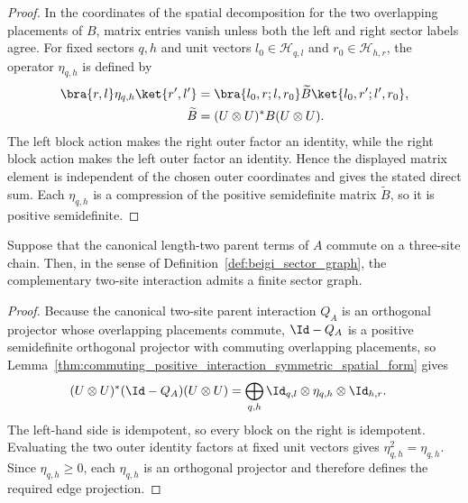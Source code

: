 \begin{proof}\leanok
    In the coordinates of the spatial decomposition for the two overlapping
    placements of $B$, matrix entries vanish unless both the left and right
    sector labels agree. For fixed sectors $q,h$ and unit vectors
    $l_0\in\mathcal H_{q,l}$ and $r_0\in\mathcal H_{h,r}$, the operator
    $\eta_{q,h}$ is defined by
    \begin{align}
        \bra{r,l}\eta_{q,h}\ket{r',l'}
         & =
        \bra{l_0,r;l,r_0}\widetilde B\ket{l_0,r';l',r_0},
        \notag \\
        \widetilde B
         & =
        (U\otimes U)^*B(U\otimes U).
        \notag
    \end{align}
    The left block action makes the right outer factor an identity, while the
    right block action makes the left outer factor an identity. Hence the
    displayed matrix element is independent of the chosen outer coordinates
    and gives the stated direct sum. Each $\eta_{q,h}$ is a compression of
    the positive semidefinite matrix $\widetilde B$, so it is positive
    semidefinite.
\end{proof}

\begin{lemma}
    \label{thm:nncph_beigi_sector_graph}
    \leanok
    Suppose that the canonical length-two parent terms of $A$ commute on a
    three-site chain. Then, in the sense of
    Definition~\ref{def:beigi_sector_graph}, the complementary two-site
    interaction admits a finite sector graph.
\end{lemma}

\begin{proof}\leanok
    Because the canonical two-site parent interaction $Q_A$ is an orthogonal
    projector whose overlapping placements commute, $\Id-Q_A$ is a positive
    semidefinite orthogonal projector with commuting overlapping placements, so
    Lemma~\ref{thm:commuting_positive_interaction_symmetric_spatial_form}
    gives
    \begin{align}
        (U\otimes U)^*(\Id-Q_A)(U\otimes U)
         & =
        \bigoplus_{q,h}
        \Id_{q,l}\otimes\eta_{q,h}\otimes\Id_{h,r}.
        \notag
    \end{align}
    The left-hand side is idempotent, so every block on the right is
    idempotent. Evaluating the two outer identity factors at fixed unit
    vectors gives $\eta_{q,h}^2=\eta_{q,h}$. Since $\eta_{q,h}\geq0$, each
    $\eta_{q,h}$ is an orthogonal projector and therefore defines the required
    edge projection.
\end{proof}

